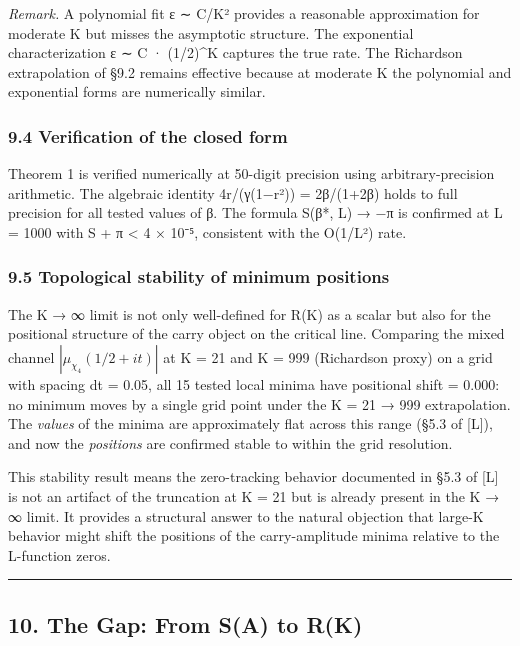 \documentclass[
  11pt,
]{article}
\begin{document}
\emph{Remark.} A polynomial fit ε ∼ C/K² provides a reasonable approximation for
moderate K but misses the asymptotic structure. The exponential characterization
ε ∼ C · (1/2)\^{}K captures the true rate. The Richardson extrapolation of §9.2
remains effective because at moderate K the polynomial and exponential forms are
numerically similar.

\subsubsection{9.4 Verification of the closed
form}\label{verification-of-the-closed-form}

Theorem 1 is verified numerically at 50-digit precision using
arbitrary-precision arithmetic. The algebraic identity 4r/(γ(1−r²)) = 2β/(1+2β)
holds to full precision for all tested values of β. The formula S(β*, L) → −π is
confirmed at L = 1000 with \textbar S + π\textbar{} \textless{} 4 × 10⁻⁵,
consistent with the O(1/L²) rate.

\subsubsection{9.5 Topological stability of minimum
positions}\label{topological-stability-of-minimum-positions}

The K → ∞ limit is not only well-defined for R(K) as a scalar but also for the
positional structure of the carry object on the critical line. Comparing the
mixed channel \(|\mu_{\chi_4}(1/2 + it)|\) at K = 21 and K = 999 (Richardson
proxy) on a grid with spacing dt = 0.05, all 15 tested local minima have
positional shift = 0.000: no minimum moves by a single grid point under the K =
21 → 999 extrapolation. The \emph{values} of the minima are approximately flat
across this range (§5.3 of {[}L{]}), and now the \emph{positions} are confirmed
stable to within the grid resolution.

This stability result means the zero-tracking behavior documented in §5.3 of
{[}L{]} is not an artifact of the truncation at K = 21 but is already present in
the K → ∞ limit. It provides a structural answer to the natural objection that
large-K behavior might shift the positions of the carry-amplitude minima
relative to the L-function zeros.

\begin{center}\rule{0.5\linewidth}{0.5pt}\end{center}

\newpage

\subsection{10. The Gap: From S(A) to R(K)}\label{the-gap-from-sa-to-rk}
\end{document}

